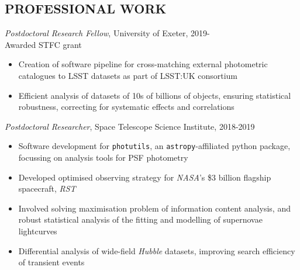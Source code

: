 \documentclass[letter, margin, 10pt]{res} %
\begin{document}
\begin{resume}

 


\vspace{-9pt}
\section{PROFESSIONAL WORK}

{\sl Postdoctoral Research Fellow}, University of Exeter, 2019-\\
\null\quad\quad Awarded STFC grant
\begin{itemize}[noitemsep,topsep=0pt,parsep=0pt,partopsep=0pt]
\item Creation of software pipeline for cross-matching external photometric catalogues to LSST datasets as part of LSST:UK consortium
\item Efficient analysis of datasets of 10s of billions of objects, ensuring statistical robustness, correcting for systematic effects and correlations
\end{itemize}
\vspace{-10pt}
{\sl Postdoctoral Researcher}, Space Telescope Science Institute, 2018-2019
\begin{itemize}[noitemsep,topsep=0pt,parsep=0pt,partopsep=0pt]
\item Software development for \texttt{photutils}, an \texttt{astropy}-affiliated python package, focussing on analysis tools for PSF photometry
\item Developed optimised observing strategy for \textit{NASA}'s \$3 billion flagship spacecraft, \textit{RST}
\item Involved solving maximisation problem of information content analysis, and robust statistical analysis of the fitting and modelling of supernovae lightcurves
\item Differential analysis of wide-field \textit{Hubble} datasets, improving search efficiency of transient events
\end{itemize}
\vspace{-6pt}

\end{resume}
\end{document}
